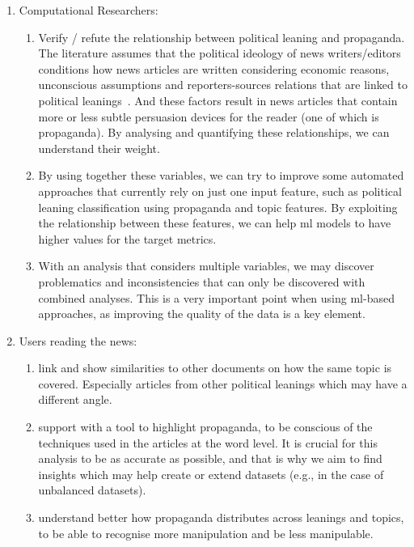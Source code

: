 \begin{enumerate}
    \item Computational Researchers:
    \begin{enumerate}
        \item Verify / refute the relationship between political leaning and propaganda. The literature assumes that the political ideology of news writers/editors conditions how news articles are written considering economic reasons, unconscious  assumptions and reporters-sources relations that are linked to political leanings~\citep{schudson2002news}. And these factors result in news articles that contain more or less subtle persuasion devices for the reader (one of which is propaganda). By analysing and quantifying these relationships, we can understand their weight. %
        \item By using together these variables, we can try to improve some automated approaches that currently rely on just one input feature, such as political leaning classification using propaganda and topic features. By exploiting the relationship between these features, we can help \acrfull{ml} models to have higher values for the target metrics. %
        \item With an analysis that considers multiple variables, we may discover problematics and inconsistencies that can only be discovered with combined analyses. This is a very important point when using \acrshort{ml}-based approaches, as improving the quality of the data is a key element. %
    \end{enumerate}
    \item Users reading the news:
    \begin{enumerate}
        \item link and show similarities to other documents on how the same topic is covered. Especially articles from other political leanings which may have a different angle.
        \item support with a tool to highlight propaganda, to be conscious of the techniques used in the articles at the word level. It is crucial for this analysis to be as accurate as possible, and that is why we aim to find insights which may help create or extend datasets (e.g., in the case of unbalanced datasets).
        \item understand better how propaganda distributes across leanings and topics, to be able to recognise more manipulation and be less manipulable.
    \end{enumerate}
\end{enumerate}


